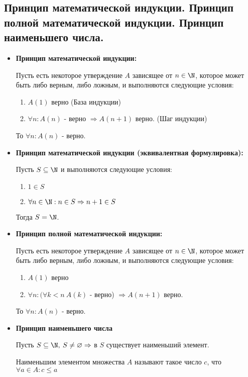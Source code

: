 \subsection{Принцип математической индукции. Принцип полной математической индукции. Принцип наименьшего числа.}{
	\begin{itemize}
		\item \textbf{Принцип математической индукции:}
		
		Пусть есть некоторое утверждение $A$ зависящее от $n \in \N$, которое может быть либо верным, либо ложным, и выполняются следующие условия:
		\begin{enumerate}
			\item $A(1)$ верно (База индукции)
			\item $\forall n : A(n)$ - верно $\Rightarrow A(n + 1)$ верно. (Шаг индукции)
		\end{enumerate}
		То $\forall n : A(n)$ - верно.
		
		\item \textbf{Принцип математической индукции (эквивалентная формулировка):}
		
		Пусть $S \subseteq \N$ и выполняются следующие условия:
		\begin{enumerate}
			\item $1 \in S$
			\item $\forall n \in \N : n \in S \Rightarrow n + 1 \in S$
		\end{enumerate}
		Тогда $S = \N$.
		
		\item \textbf{Принцип полной математической индукции:}
		
		Пусть есть некоторое утверждение $A$ зависящее от $n \in \N$, которое может быть либо верным, либо ложным, и выполняются следующие условия:
		\begin{enumerate}
			\item $A(1)$ верно
			\item $\forall n : (\forall k < n \: A(k)$ - верно) $\Rightarrow A(n + 1)$ верно.
		\end{enumerate}
		То $\forall n : A(n)$ - верно.
		
		\item \textbf{Принцип наименьшего числа}
		
		Пусть $S \subseteq \N, \: S \neq \varnothing \Rightarrow$ в $S$ существует наименьший элемент.
		
		Наименьшим элементом множества $A$ называют такое число $c$, что $\forall a \in A : c \leqslant a$
		
	\end{itemize}
}